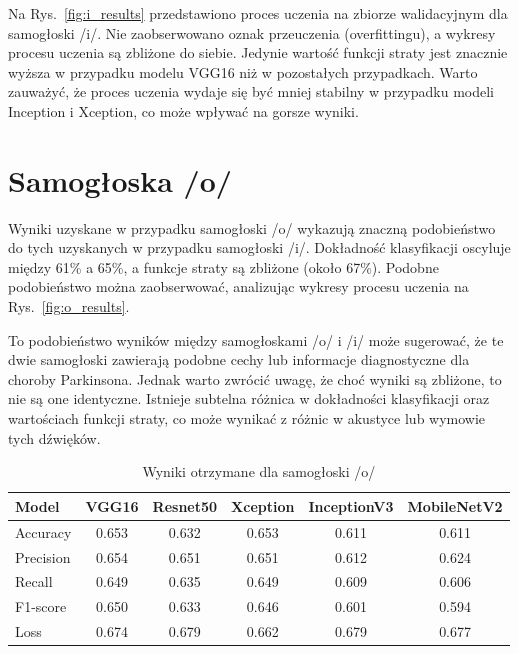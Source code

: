 Na Rys.~\ref{fig:i_results} przedstawiono proces uczenia na zbiorze walidacyjnym dla samogłoski /i/.
Nie zaobserwowano oznak przeuczenia (overfittingu), a wykresy procesu uczenia są zbliżone do siebie.
Jedynie wartość funkcji straty jest znacznie wyższa w przypadku modelu VGG16 niż w pozostałych przypadkach.
Warto zauważyć, że proces uczenia wydaje się być mniej stabilny w przypadku modeli Inception i Xception, co może wpływać na gorsze wyniki.

\section{Samogłoska /o/}
\label{sec:samogloska-o}

Wyniki uzyskane w przypadku samogłoski /o/ wykazują znaczną podobieństwo do tych uzyskanych w przypadku samogłoski /i/.
Dokładność klasyfikacji oscyluje między 61\% a 65\%, a funkcje straty są zbliżone (około 67\%).
Podobne podobieństwo można zaobserwować, analizując wykresy procesu uczenia na Rys.~\ref{fig:o_results}.

To podobieństwo wyników między samogłoskami /o/ i /i/ może sugerować, że te dwie samogłoski zawierają podobne cechy lub informacje diagnostyczne dla choroby Parkinsona.
Jednak warto zwrócić uwagę, że choć wyniki są zbliżone, to nie są one identyczne.
Istnieje subtelna różnica w dokładności klasyfikacji oraz wartościach funkcji straty, co może wynikać z różnic w akustyce lub wymowie tych dźwięków.

\begin{table}[ht]
\centering
\caption{Wyniki otrzymane dla samogłoski /o/}
\label{tab:wyniki-o}
\begin{tabular}{|l|c|c|c|c|c|}
\hline
\textbf{Model} &\textbf{VGG16} &\textbf{Resnet50} &\textbf{Xception} &\textbf{InceptionV3} &\textbf{MobileNetV2} \\ \hline
    Accuracy &0.653 &0.632 &0.653 &0.611 &0.611 \\ \hline
    Precision &0.654 &0.651 &0.651 &0.612 &0.624 \\ \hline
    Recall &0.649 &0.635 &0.649 &0.609 &0.606 \\ \hline
    F1-score &0.650 &0.633 &0.646 &0.601 &0.594 \\ \hline
    Loss &0.674 &0.679 &0.662 &0.679 &0.677 \\ \hline
\end{tabular}
\end{table}

